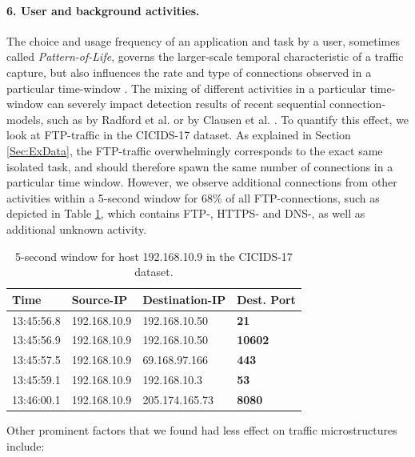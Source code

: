 \documentclass[runningheads]{llncs}
\begin{document}
\paragraph{6. User and background activities.}
The choice and usage frequency of an application and task by a user, sometimes called \textit{Pattern-of-Life}, governs the larger-scale temporal characteristic of a traffic capture, but also influences the rate and type of connections observed in a particular time-window \cite{aparicio2017using}. The mixing of different activities in a particular time-window can severely impact detection results of recent sequential connection-models, such as by Radford et al. \cite{radford2018network} or by Clausen et al. \cite{henryLSTM}. To quantify this effect, we look at FTP-traffic in the CICIDS-17 dataset. As explained in Section \ref{Sec:ExData}, the FTP-traffic overwhelmingly corresponds to the exact same isolated task, and should therefore spawn the same number of connections in a particular time window. However, we observe additional connections from other activities within a 5-second window for $68\%$ of all FTP-connections, such as depicted in Table \ref{Tab:Sess}, which contains FTP-, HTTPS- and DNS-, as well as additional unknown activity.

\begin{table}[h!]
\centering
\begin{tabular}{l|l|l|>{\bfseries}l}
Time& Source-IP &Destination-IP& Dest. Port\\ \hline
13:45:56.8 & 192.168.10.9 & 192.168.10.50 &    21 \\ \hline
13:45:56.9 & 192.168.10.9 & 192.168.10.50 &  10602\\ \hline
13:45:57.5 & 192.168.10.9 & 69.168.97.166 &   443\\ \hline
13:45:59.1 & 192.168.10.9 &  192.168.10.3 &    53\\ \hline
13:46:00.1 & 192.168.10.9 & 205.174.165.73 &   8080\\ \hline
\end{tabular}
\vspace{0.2cm}
\caption{5-second window for host 192.168.10.9 in the CICIDS-17 dataset.}\label{Tab:Sess}
\vspace{-1cm}
\end{table}


Other prominent factors that we found had less effect on traffic microstructures include:
\end{document}
